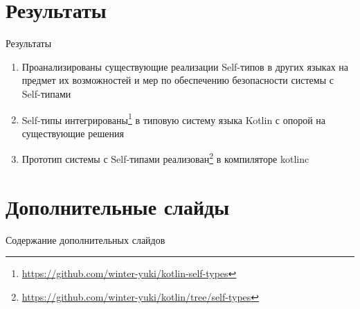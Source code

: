 \documentclass[usenames, dvipsnames]{beamer}
\begin{document}
    \section{Результаты}

    \begin{frame}{Результаты}

        \begin{enumerate}
            \item Проанализированы существующие реализации Self-типов в других языках на предмет их возможностей и мер по обеспечению безопасности системы с Self-типами
            \item Self-типы интегрированы\footnote{\url{https://github.com/winter-yuki/kotlin-self-types}} в типовую систему языка Kotlin с опорой на существующие решения
            \item Прототип системы с Self-типами реализован\footnote{\url{https://github.com/winter-yuki/kotlin/tree/self-types}} в компиляторе kotlinc
        \end{enumerate}
    \end{frame}


    \appendix


    \section{Дополнительные слайды}

    \begin{frame}{Содержание дополнительных слайдов}
        \tableofcontents
    \end{frame}
\end{document}
